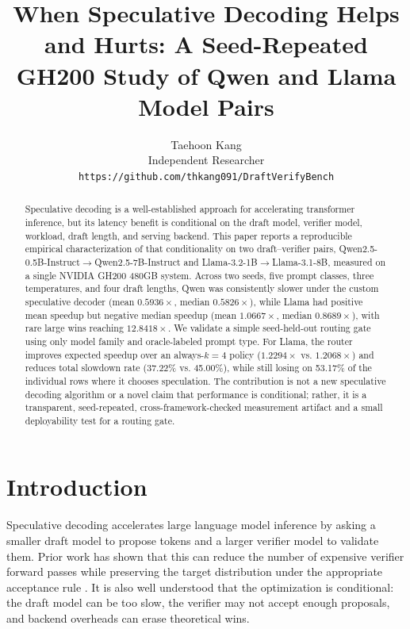 \documentclass{article}
\title{When Speculative Decoding Helps and Hurts: A Seed-Repeated GH200 Study of Qwen and Llama Model Pairs}
\author{%
  Taehoon Kang \\
  Independent Researcher \\
  \texttt{https://github.com/thkang091/DraftVerifyBench}
}
\begin{document}
\maketitle

\begin{abstract}
Speculative decoding is a well-established approach for accelerating transformer inference, but its latency benefit is conditional on the draft model, verifier model, workload, draft length, and serving backend.
This paper reports a reproducible empirical characterization of that conditionality on two draft--verifier pairs, Qwen2.5-0.5B-Instruct$\rightarrow$Qwen2.5-7B-Instruct and Llama-3.2-1B$\rightarrow$Llama-3.1-8B, measured on a single NVIDIA GH200 480GB system.
Across two seeds, five prompt classes, three temperatures, and four draft lengths, Qwen was consistently slower under the custom speculative decoder (mean $0.5936\times$, median $0.5826\times$), while Llama had positive mean speedup but negative median speedup (mean $1.0667\times$, median $0.8689\times$), with rare large wins reaching $12.8418\times$.
We validate a simple seed-held-out routing gate using only model family and oracle-labeled prompt type.
For Llama, the router improves expected speedup over an always-$k=4$ policy ($1.2294\times$ vs. $1.2068\times$) and reduces total slowdown rate (37.22\% vs. 45.00\%), while still losing on 53.17\% of the individual rows where it chooses speculation.
The contribution is not a new speculative decoding algorithm or a novel claim that performance is conditional; rather, it is a transparent, seed-repeated, cross-framework-checked measurement artifact and a small deployability test for a routing gate.
\end{abstract}

\section{Introduction}

Speculative decoding accelerates large language model inference by asking a smaller draft model to propose tokens and a larger verifier model to validate them.
Prior work has shown that this can reduce the number of expensive verifier forward passes while preserving the target distribution under the appropriate acceptance rule \cite{leviathan2022speculative,chen2023speculative}.
It is also well understood that the optimization is conditional: the draft model can be too slow, the verifier may not accept enough proposals, and backend overheads can erase theoretical wins.
\end{document}
